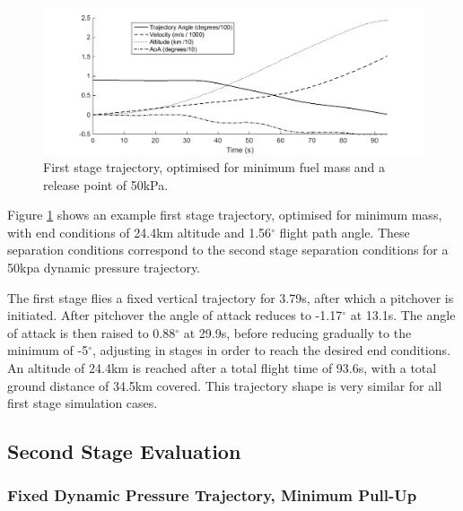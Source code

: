 \begin{figure}[ht]
	\centering
	\includegraphics[width=.9\linewidth]{figures/5_Ascent/FirstStage}
	\caption{First stage trajectory, optimised for minimum fuel mass and a release point of 50kPa.}
	\label{fig:FirstStage}
\end{figure}



Figure \ref{fig:FirstStage} shows an example first stage trajectory, optimised for minimum mass, with end conditions of 24.4km altitude and 1.56$^\circ$ flight path angle. These separation conditions correspond to the second stage separation conditions for a 50kpa dynamic pressure trajectory.

The first stage flies a fixed vertical trajectory for 3.79s, after which a pitchover is initiated. 
After pitchover the angle of attack reduces to -1.17$^\circ$ at 13.1s. The angle of attack is then raised to 0.88$^\circ$ at 29.9s, before reducing gradually to the minimum of -5$^\circ$, adjusting in stages in order to reach the desired end conditions. 
An altitude of 24.4km is reached after a total flight time of 93.6s, with a total ground distance of 34.5km covered. 
This trajectory shape is very similar for all first stage simulation cases. 



\subsection{Second Stage Evaluation}
\subsubsection{Fixed Dynamic Pressure Trajectory, Minimum Pull-Up} \label{subsection:Fixed}

